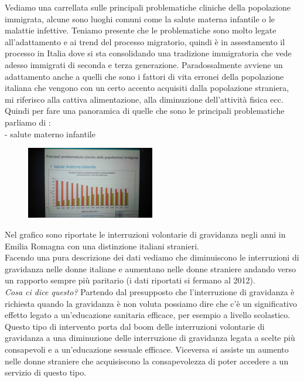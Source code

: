 Vediamo una carrellata sulle principali problematiche cliniche della
popolazione immigrata, alcune sono luoghi comuni come la salute materna
infantile o le malattie infettive. Teniamo presente che le problematiche
sono molto legate all'adattamento e ai trend del processo migratorio,
quindi è in assestamento il processo in Italia dove si sta consolidando
una tradizione immigratoria che vede adesso immigrati di seconda e terza
generazione. Paradossalmente avviene un adattamento anche a quelli che
sono i fattori di vita erronei della popolazione italiana che vengono
con un certo accento acquisiti dalla popolazione straniera, mi riferisco
alla cattiva alimentazione, alla diminuzione dell'attività fisica ecc.\\
Quindi per fare una panoramica di quelle che sono le principali
problematiche parliamo di :\\
- salute materno infantile

\begin{figure}[!ht]
\centering
	\includegraphics[width=0.5\textwidth]{27/image3.jpeg}
	\end{figure}

Nel grafico sono riportate le interruzioni volontarie di gravidanza
negli anni in Emilia Romagna con una distinzione italiani stranieri.\\
Facendo una pura descrizione dei dati vediamo che diminuiscono le
interruzioni di gravidanza nelle donne italiane e aumentano nelle donne
straniere andando verso un rapporto sempre più paritario (i dati
riportati si fermano al 2012).\\
\emph{Cosa ci dice questo?} Partendo dal presupposto che l'interruzione
di gravidanza è richiesta quando la gravidanza è non voluta possiamo
dire che c'è un significativo effetto legato a un'educazione sanitaria
efficace, per esempio a livello scolastico. Questo tipo di intervento
porta dal boom delle interruzioni volontarie di gravidanza a una
diminuzione delle interruzione di gravidanza legata a scelte più
consapevoli e a un'educazione sessuale efficace. Viceversa si assiste un
aumento nelle donne straniere che acquisiscono la consapevolezza di
poter accedere a un servizio di questo tipo.

